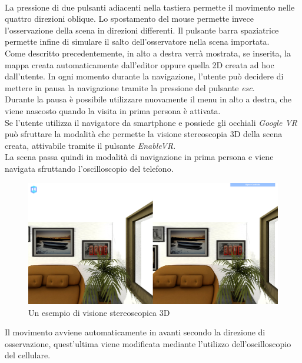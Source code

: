 \\ 
La pressione di due pulsanti adiacenti nella tastiera permette il movimento nelle quattro direzioni oblique. Lo spostamento del mouse permette invece l’osservazione della scena in direzioni differenti.
Il pulsante barra spaziatrice permette infine di simulare il salto dell’osservatore nella scena importata.
\\
Come descritto precedentemente, in alto a destra verrà mostrata, se inserita, la mappa creata automaticamente dall’editor oppure quella 2D creata ad hoc dall’utente.
In ogni momento durante la navigazione, l’utente può decidere di mettere in pausa la navigazione tramite la pressione del pulsante \emph{esc}.
\\
Durante la pausa è possibile utilizzare nuovamente il menu in alto a destra, che viene nascosto quando la visita in prima persona è attivata.
\\
Se l’utente utilizza il navigatore da smartphone e possiede gli occhiali \emph{Google VR}  può sfruttare la modalità che permette la visione stereoscopia 3D della scena creata, attivabile tramite il pulsante \emph{EnableVR}.
\\
La scena passa quindi in modalità di navigazione in prima persona e viene navigata sfruttando l’oscilloscopio del telefono.
\\
\begin{figure}[htb]
 \centering
 \includegraphics[width=1\linewidth]{images/chapter_caso_uso/google_vr.png}\hfill
 \caption[Esempio di visione stereoscopica 3D]{Un esempio di visione stereoscopica 3D}
 \label{fig:caso_uso_vista_alto}
\end{figure}

Il movimento avviene automaticamente in avanti secondo la direzione di osservazione, quest’ultima viene modificata mediante l’utilizzo dell’oscilloscopio del cellulare.


